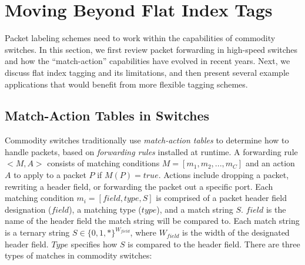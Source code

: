 \section{Moving Beyond Flat Index Tags}
\label{sec:background}


Packet labeling schemes need to work within the capabilities of commodity switches.  In this section, we first review packet forwarding in high-speed switches and how the ``match-action'' capabilities have evolved in recent years.  Next, we discuss flat index tagging and its limitations, and then present several example applications that would benefit from more flexible tagging schemes.

\subsection{Match-Action Tables in Switches}
Commodity switches traditionally use \emph{match-action tables} to determine how to handle packets, based on \textit{forwarding rules} installed at runtime. A forwarding rule $<M, A>$ consists of matching conditions $M = [m_1, m_2, ..., m_C]$ and an action $A$ to apply to a packet $P$ if $M(P) = true$. Actions include dropping a packet, rewriting a header field, or forwarding the packet out a specific port. Each matching condition $m_i = [field, type, S]$ is comprised of a packet header field designation ($field$), a matching type ($type$), and a match string $S$. $field$ is the name of the header field the match string will be compared to. Each match string is a ternary string $S \in \{0,1,*\}^{W_{field}}$, where $W_{field}$ is the width of the designated header field. $Type$ specifies how $S$ is compared to the header field. There are three types of matches in commodity switches:

